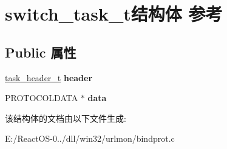 \hypertarget{structswitch__task__t}{}\section{switch\+\_\+task\+\_\+t结构体 参考}
\label{structswitch__task__t}
\subsection*{Public 属性}
\begin{DoxyCompactItemize}
\item 
\mbox{\label{structswitch__task__t_a05a5766a6883ec81f6e6fdb526d4abaf}} 
\hyperlink{structtask__header__t}{task\+\_\+header\+\_\+t} {\bfseries header}
\item 
\mbox{\label{structswitch__task__t_a400e45185be5b1dd6745eef815c07b6e}} 
P\+R\+O\+T\+O\+C\+O\+L\+D\+A\+TA $\ast$ {\bfseries data}
\end{DoxyCompactItemize}


该结构体的文档由以下文件生成\+:\begin{DoxyCompactItemize}
\item 
E\+:/\+React\+O\+S-\/0../dll/win32/urlmon/bindprot.\+c\end{DoxyCompactItemize}
